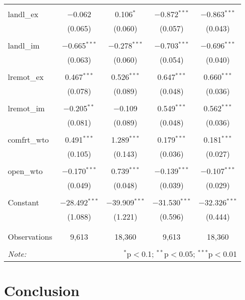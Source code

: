\documentclass[letterpaper,twoside,12pt]{article}
\begin{document}
\begin{table}[!htbp]
\begin{tabular}{@{\extracolsep{5pt}}lcccc}
  & & & & \\ 
 landl\_ex & $-$0.062 & 0.106$^{*}$ & $-$0.872$^{***}$ & $-$0.863$^{***}$ \\ 
  & (0.065) & (0.060) & (0.057) & (0.043) \\ 
  & & & & \\ 
 landl\_im & $-$0.665$^{***}$ & $-$0.278$^{***}$ & $-$0.703$^{***}$ & $-$0.696$^{***}$ \\ 
  & (0.063) & (0.060) & (0.054) & (0.040) \\ 
  & & & & \\ 
 lremot\_ex & 0.467$^{***}$ & 0.526$^{***}$ & 0.647$^{***}$ & 0.660$^{***}$ \\ 
  & (0.078) & (0.089) & (0.048) & (0.036) \\ 
  & & & & \\ 
 lremot\_im & $-$0.205$^{**}$ & $-$0.109 & 0.549$^{***}$ & 0.562$^{***}$ \\ 
  & (0.081) & (0.089) & (0.048) & (0.036) \\ 
  & & & & \\ 
 comfrt\_wto & 0.491$^{***}$ & 1.289$^{***}$ & 0.179$^{***}$ & 0.181$^{***}$ \\ 
  & (0.105) & (0.143) & (0.036) & (0.027) \\ 
  & & & & \\ 
 open\_wto & $-$0.170$^{***}$ & 0.739$^{***}$ & $-$0.139$^{***}$ & $-$0.107$^{***}$ \\ 
  & (0.049) & (0.048) & (0.039) & (0.029) \\ 
  & & & & \\ 
 Constant & $-$28.492$^{***}$ & $-$39.909$^{***}$ & $-$31.530$^{***}$ & $-$32.326$^{***}$ \\ 
  & (1.088) & (1.221) & (0.596) & (0.444) \\ 
  & & & & \\ 
\hline \\[-1.8ex] 
Observations & 9,613 & 18,360 & 9,613 & 18,360 \\ 
\hline 
\hline \\[-1.8ex] 
\textit{Note:}  & \multicolumn{4}{r}{$^{*}$p$<$0.1; $^{**}$p$<$0.05; $^{***}$p$<$0.01} \\ 
\end{tabular} 
\end{table}

\newpage

\section{Conclusion}\label{conclusion}
\end{document}
